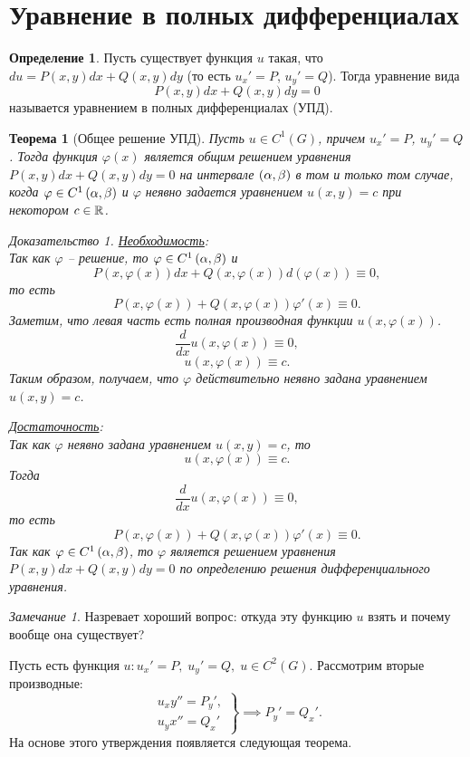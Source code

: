 \documentclass[a5paper, 10pt]{article}
\theoremstyle{definition}
\newtheorem{Def}{Определение}
\theoremstyle{plain}
\newtheorem{Th}{Теорема}
\theoremstyle{remark}
\newtheorem*{Note}{Замечание}
\newtheorem*{Proof}{Доказательство}
\begin{document}
	\section[УПД]{Уравнение в полных дифференциалах}
	\begin{Def}
		Пусть существует функция $u$ такая, что $du = P(x,y)dx + Q(x,y)dy$ (то есть $u_x'=P$, $u_y'=Q$). Тогда уравнение вида 
		\begin{equation}
			P(x,y)dx + Q(x,y)dy = 0
		\end{equation}
		называется уравнением в полных дифференциалах (\textsc{УПД}).
	\end{Def}
	
	\begin{Th}[Общее решение УПД]
		Пусть $u \in C^1 (G)$, причем $u_x'=P$, $u_y'=Q$. Тогда функция $\varphi(x)$ является общим решением уравнения $P(x,y)dx + Q(x,y)dy = 0$ на интервале $\left(\alpha, \beta\right)$ в том и только том случае, когда $\varphi \in C^{1} \left(\alpha,\beta\right)$ и $\varphi$ неявно задается уравнением $u(x,y) = c$ при некотором $c\in \mathbb{R}$.
		\begin{Proof}
			\underline{Необходимость}:\\
			Так как $\varphi$ -- решение, то $\varphi \in C^{1} \left(\alpha,\beta\right)$ и 
			\[
			P(x,\varphi(x))dx + Q(x,\varphi(x))d(\varphi(x)) \equiv 0,
			\]
			то есть 
			\[
			P(x,\varphi(x)) + Q(x,\varphi(x))\varphi'(x) \equiv 0.
			\]
			Заметим, что левая часть есть полная производная функции $u(x, \varphi(x))$.
			\[
			\frac{d}{dx} u(x,\varphi(x)) \equiv 0,
			\]
			\[
			u(x, \varphi(x)) \equiv c.
			\]
			Таким образом, получаем, что $\varphi$ действительно неявно задана уравнением $u(x,y)=c$.
			
			\underline{Достаточность}:\\
			Так как $\varphi$ неявно задана уравнением $u(x,y)=c$, то 
			\[
			u(x, \varphi(x)) \equiv c.
			\]
			Тогда \[
			\frac{d}{dx} u(x,\varphi(x)) \equiv 0,
			\]
			то есть 
			\[
			P(x,\varphi(x)) + Q(x,\varphi(x))\varphi'(x) \equiv 0.
			\]
			Так как $\varphi \in C^{1} \left(\alpha,\beta\right)$, то $\varphi$ является решением уравнения $P(x,y)dx + Q(x,y)dy = 0$ по определению решения дифференциального уравнения.
		\end{Proof}
	\end{Th}

	\begin{Note}
	Назревает хороший вопрос: откуда эту функцию $u$ взять и почему вообще она существует?
	
	Пусть есть функция $u: u_x'=P, \; u_y' = Q, \; u\in C^2(G)$. Рассмотрим вторые производные:
	\[
	\left.
	\begin{split}
		u_xy''=P_y', \\
		u_yx'' = Q_x'
	\end{split}
	\right\} \implies P_y' = Q_x'.
	\]
	На основе этого утверждения появляется следующая теорема.
	\end{Note}
	
\end{document}
